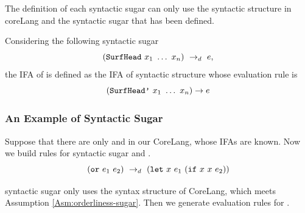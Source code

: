 \begin{Asm}
    \label{Asm:orderliness-sugar}
    The definition of each syntactic sugar can only use the syntactic structure in coreLang and the syntactic sugar that has been defined.
\end{Asm}

\begin{Def}
    \label{def:ifa-sugar}
    Considering the following syntactic sugar
    \[
        (\mbox{\tt SurfHead}~x_1~\ldots~x_n) ~\rightarrow_d~ e,
    \]
    the IFA of  is defined as the IFA of syntactic structure  whose evaluation rule is
    \[
        (\mbox{\tt SurfHead'}~x_1~\ldots~x_n) \to e
    \]

\end{Def}

\subsubsection{An Example of Syntactic Sugar}

Suppose that there are only  and  in our CoreLang, whose IFAs are known. Now we build rules for syntactic sugar  and .
\[
    (\mbox{\tt or}~e_1~e_2) ~\rightarrow_d~ (\mbox{\tt let}~x~e_1~(\mbox{\tt if}~x~x~e_2))
\]

 syntactic sugar only uses the syntax structure of CoreLang, which meets Assumption \ref{Asm:orderliness-sugar}. Then we generate evaluation rules for .

